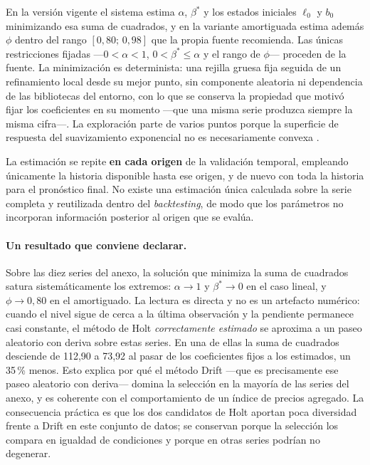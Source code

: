 \documentclass[12pt,letterpaper]{article}
\providecommand{\parencite}{\citep}
\begin{document}
En la versión vigente el sistema estima \(\alpha\), \(\beta^{*}\) y los estados iniciales \(\ell_0\) y \(b_0\) minimizando esa suma de cuadrados, y en la variante amortiguada estima además \(\phi\) dentro del rango \([0{,}80;\,0{,}98]\) que la propia fuente recomienda. Las únicas restricciones fijadas ---\(0<\alpha<1\), \(0<\beta^{*}\le\alpha\) y el rango de \(\phi\)--- proceden de la fuente. La minimización es determinista: una rejilla gruesa fija seguida de un refinamiento local desde su mejor punto, sin componente aleatoria ni dependencia de las bibliotecas del entorno, con lo que se conserva la propiedad que motivó fijar los coeficientes en su momento ---que una misma serie produzca siempre la misma cifra---. La exploración parte de varios puntos porque la superficie de respuesta del suavizamiento exponencial no es necesariamente convexa \parencite{gardner2006}.

La estimación se repite \textbf{en cada origen} de la validación temporal, empleando únicamente la historia disponible hasta ese origen, y de nuevo con toda la historia para el pronóstico final. No existe una estimación única calculada sobre la serie completa y reutilizada dentro del \emph{backtesting}, de modo que los parámetros no incorporan información posterior al origen que se evalúa.

\paragraph{Un resultado que conviene declarar.} Sobre las diez series del anexo, la solución que minimiza la suma de cuadrados satura sistemáticamente los extremos: \(\alpha\to1\) y \(\beta^{*}\to0\) en el caso lineal, y \(\phi\to0{,}80\) en el amortiguado. La lectura es directa y no es un artefacto numérico: cuando el nivel sigue de cerca a la última observación y la pendiente permanece casi constante, el método de Holt \emph{correctamente estimado} se aproxima a un paseo aleatorio con deriva sobre estas series. En una de ellas la suma de cuadrados desciende de 112,90 a 73,92 al pasar de los coeficientes fijos a los estimados, un 35\,\% menos. Esto explica por qué el método Drift ---que es precisamente ese paseo aleatorio con deriva--- domina la selección en la mayoría de las series del anexo, y es coherente con el comportamiento de un índice de precios agregado. La consecuencia práctica es que los dos candidatos de Holt aportan poca diversidad frente a Drift en este conjunto de datos; se conservan porque la selección los compara en igualdad de condiciones y porque en otras series podrían no degenerar.
\end{document}
